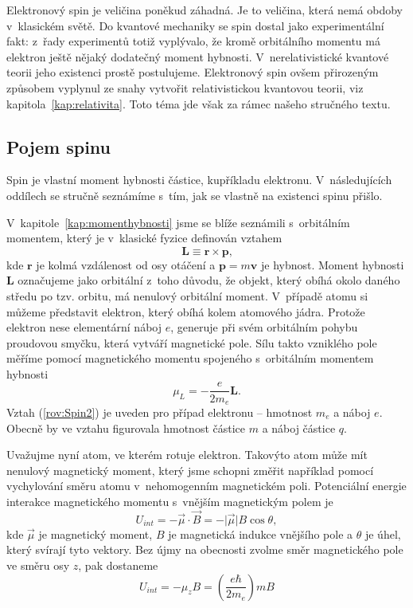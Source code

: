 Elektronový spin je veličina poněkud záhadná. Je to veličina, která nemá obdoby v~klasickém světě. Do kvantové mechaniky se spin dostal jako experimentální fakt: z~řady experimentů totiž vyplývalo, že kromě orbitálního momentu má elektron ještě nějaký dodatečný moment hybnosti. V~nerelativistické kvantové teorii jeho existenci prostě postulujeme. Elektronový spin ovšem přirozeným způsobem vyplynul ze snahy vytvořit relativistickou kvantovou teorii, viz kapitola~\ref{kap:relativita}. Toto téma jde však za rámec našeho stručného textu.

\subsection{Pojem spinu}
\label{kap:PojemSpinu}

Spin je vlastní moment hybnosti částice, kupříkladu elektronu. V~následujících oddílech se stručně seznámíme s~tím, jak se vlastně na existenci spinu přišlo.

V~kapitole~\ref{kap:momenthybnosti} jsme se blíže seznámili s~orbitálním momentem, který je v~klasické fyzice definován vztahem
\begin{equation}
\mathbf{L} \equiv \mathbf{r} \times \mathbf{p} \mbox{,}
\label{rov:Spin1}
\end{equation}
kde $\mathbf{r}$ je kolmá vzdálenost od osy otáčení a $\mathbf{p} = m \mathbf{v}$ je hybnost. Moment hybnosti $\mathbf{L}$ označujeme jako orbitální z~toho důvodu, že objekt, který obíhá okolo daného středu po tzv. orbitu, má nenulový orbitální moment. V~případě atomu si můžeme představit elektron, který obíhá kolem atomového jádra. Protože elektron nese elementární náboj $e$, generuje při svém orbitálním pohybu proudovou smyčku, která vytváří magnetické pole. Sílu takto vzniklého pole měříme pomocí magnetického momentu spojeného s~orbitálním momentem hybnosti
\begin{equation}
\mu_L = -\frac{e}{2m_e}\mathbf{L} \mbox{.}
\label{rov:Spin2}
\end{equation}
Vztah (\ref{rov:Spin2}) je uveden pro případ elektronu -- hmotnost $m_e$ a náboj $e$. Obecně by ve vztahu figurovala hmotnost částice $m$ a náboj částice $q$. 

Uvažujme nyní atom, ve kterém rotuje elektron. Takovýto atom může mít nenulový magnetický moment, který jsme schopni změřit například pomocí vychylování směru atomu v~nehomogenním magnetickém poli. Potenciální energie interakce magnetického momentu s~vnějším magnetickým polem je
\begin{equation}
U_{int} = - \vec{\mu} \cdot \vec{B} = - \vert \vec{\mu} \vert B \cos \theta,
\nonumber
\end{equation}
kde $\vec{\mu}$ je magnetický moment, $B$ je magnetická indukce vnějšího pole a $\theta$ je úhel, který svírají tyto vektory. Bez újmy na obecnosti zvolme směr magnetického pole ve směru osy $z$, pak dostaneme
\begin{equation}
U_{int} = - \mu_z B = \left( \frac{e \hbar}{2 m_e} \right) m B
\label{rov:Spin26}
\end{equation}

